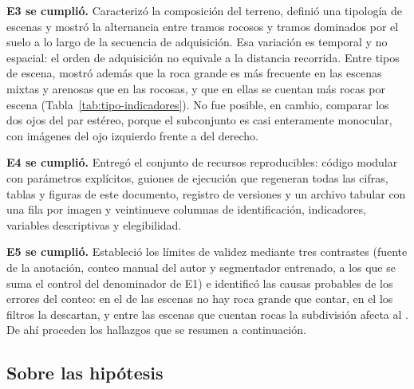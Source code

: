 \textbf{E3 se cumplió.} Caracterizó la composición del terreno, definió una tipología de escenas y mostró la
alternancia entre tramos rocosos y tramos dominados por el suelo a lo largo de la secuencia de
adquisición. Esa variación es temporal y no espacial: el orden de adquisición no equivale a la
distancia recorrida. Entre tipos de escena, mostró además que la roca grande es más frecuente en las escenas
mixtas y arenosas que en las rocosas, y que en ellas se cuentan más rocas por escena
(Tabla~\ref{tab:tipo-indicadores}). No fue posible, en cambio,
comparar los dos ojos del par estéreo, porque el subconjunto es casi enteramente monocular, con
\cNOjoIzq{} imágenes del ojo izquierdo frente a \cNOjoDer{} del derecho.

\textbf{E4 se cumplió.} Entregó el conjunto de recursos reproducibles: código modular con parámetros
explícitos, guiones de ejecución que regeneran todas las cifras, tablas y figuras de este
documento, registro de versiones y un archivo tabular con una fila por imagen y veintinueve
columnas de identificación, indicadores, variables descriptivas y elegibilidad.

\textbf{E5 se cumplió.} Estableció los límites de validez mediante tres contrastes (fuente de la
anotación, conteo manual del autor y segmentador entrenado, a los que se suma el control del
denominador de E1) e identificó las causas probables de los errores del conteo: en el \cPctSinBig{} de las escenas no hay
roca grande que contar, en el \cPctFiltradas{} los filtros la descartan, y entre las escenas que
cuentan rocas la subdivisión afecta al \cPctSubdiv. De ahí proceden los hallazgos que se resumen
a continuación.

\subsection{Sobre las hipótesis}

